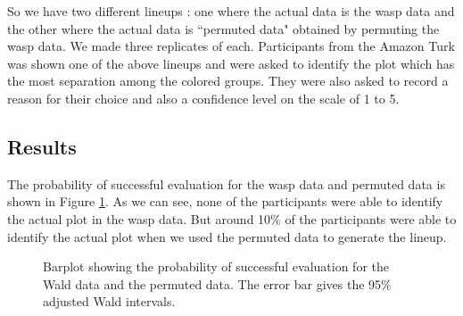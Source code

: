 \documentclass[12]{article}
\begin{document}
So we have two different lineups : one where the actual data is the wasp data and the other where the actual data is ``permuted data" obtained by permuting the wasp data. We made three replicates of each. Participants from the Amazon Turk was shown one of the above lineups and were asked to identify the plot which has the most separation among the colored groups. They were also asked to record a reason for their choice and also a confidence level on the scale of 1 to 5.

\subsection{Results}

The probability of successful evaluation for the wasp data and permuted data is shown in Figure \ref{wasp-result}. As we can see, none of the participants were able to identify the actual plot in the wasp data. But around 10\% of the participants were able to identify the actual plot when we used the permuted data to generate the lineup.

\begin{figure}[hbtp]
   \centering
       \caption{Barplot showing the probability of successful evaluation for the Wald data and the permuted data. The error bar gives the 95\% adjusted Wald intervals. }
       \label{wasp-result}
\end{figure} 
\end{document}
